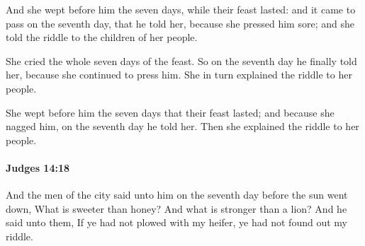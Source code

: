 			\begin{versebox}
					\item[BHS] 
					\item[ASV] And she wept before him the seven days, while their feast lasted: and it came to pass on the seventh day, that he told her, because she pressed him sore; and she told the riddle to the children of her people.
					\item[NIV] She cried the whole seven days of the feast. So on the seventh day he finally told her, because she continued to press him. She in turn explained the riddle to her people.
					\item[NRSV] She wept before him the seven days that their feast lasted; and because she nagged him, on the seventh day he told her. Then she explained the riddle to her people.
			\end{versebox}

		\paragraph{Judges 14:18} %
			\label{JUDGES-14-18}

			And the men of the city said unto him on the seventh day before the sun went down, What is sweeter than honey? And what is stronger than a lion? And he said unto them, If ye had not plowed with my heifer, ye had not found out my riddle.


